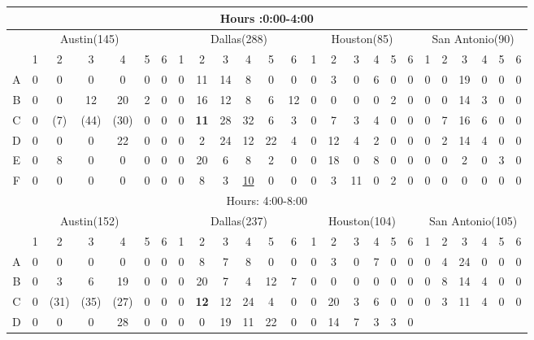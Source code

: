 \begin{table*}	
\centering	
\begin{tabular}{|c|c|c|c|c|c|c|c|c|c|c|c|c|c|c|c|c|c|c|c|c|c|c|c|c|}	
\hline	
\multicolumn{25}{|c|}{Hours :0:00-4:00} 	\\
\hline	
\multicolumn{7}{|c|}{Austin(145)} 	&
\multicolumn{6}{c|}{Dallas(288)} 	&
\multicolumn{6}{c|}{Houston(85)} 	&
\multicolumn{6}{c|}{San Antonio(90)} 	\\
\hline	
\hline	
 & 1 &2 & 3 & 4 & 5&6 	
 & 1 &2 & 3 & 4 & 5&6 	
 & 1 &2 & 3 & 4 & 5&6 	
 & 1 &2 & 3 & 4 & 5&6 \\	
\hline
A	
& 0& 0& 0& 0& 0& 0  &	
 0& 11& 14& 8& 0& 0 &
 0& 3& 0& 6& 0& 0  &	
 0& 0& 19& 0& 0& 0  \\
\hline	
B	
& 0& 0& 12& 20& 2& 0 &
 0& 16& 12& 8& 6& 12 
& 0& 0& 0& 0& 2& 0  
& 0& 0& 14& 3& 0& 0\\
\hline	
C	
& 0& (7)& (44)& (30)& 0& 0  
& 0& \textbf{11}& 28& 32& 6& 3
& 0& 7& 3& 4& 0& 0  
& 0& 7& 16& 6& 0& 0  \\		
\hline
D 	
& 0& 0& 0& 22& 0& 0  
& 0& 2& 24& 12& 22& 4 
& 0& 12& 4& 2& 0& 0
& 0& 2& 14& 4& 0& 0  \\	
\hline
E 	
& 0& 8& 0& 0& 0& 0  
& 0& 20& 6& 8& 2& 0
& 0& 18& 0& 8& 0& 0
& 0& 0& 2& 0& 3& 0 \\
\hline
F 	
& 0& 0& 0& 0& 0& 0  
& 0& 8& 3& \underline{10}& 0& 0 
& 0& 3& 11& 0& 2& 0
& 0& 0& 0& 0& 0& 0  \\		
\hline	
\hline	
\multicolumn{25}{|c|}{Hours: 4:00-8:00} 	\\
\hline	
\multicolumn{7}{|c|}{Austin(152)} 	&
\multicolumn{6}{c|}{Dallas(237)} 	&
\multicolumn{6}{c|}{Houston(104)} 	&
\multicolumn{6}{c|}{San Antonio(105)} 	\\
\hline	
\hline	
 & 1 &2 & 3 & 4 & 5&6 	
 & 1 &2 & 3 & 4 & 5&6 	
 & 1 &2 & 3 & 4 & 5&6 	
 & 1 &2 & 3 & 4 & 5&6 \\	
\hline
A	
& 0& 0& 0& 0& 0& 0
& 0& 8& 7& 8& 0& 0 
& 0& 3& 0& 7& 0& 0 
& 0& 4& 24& 0& 0& 0 \\
\hline
B
& 0& 3& 6& 19& 0& 0
& 0& 20& 7& 4& 12& 7
& 0& 0& 0& 0& 0& 0
& 0& 8& 14& 4& 0& 0\\
\hline
C
& 0& (31)& (35)& (27)& 0& 0
& 0& \textbf{12}& 12& 24& 4& 0
& 0& 20& 3 & 6& 0& 0  
& 0& 3& 11& 4& 0& 0\\
\hline
D
& 0& 0& 0& 28& 0& 0
& 0& 0& 19& 11& 22& 0
& 0& 14& 7& 3& 3& 0

\end{tabular}
\end{table*}
